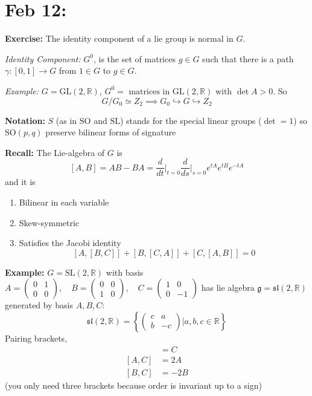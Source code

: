 \documentclass[12pt]{article}
\newcommand{\R}{\mathbb{R}}
\newcommand{\SL}{\text{SL}}
\newcommand{\SO}{\text{SO}}
\newcommand{\GL}{\text{GL}}
\newcommand{\g}{\mathfrak{g}}
\begin{document}
\section{Feb 12:}
    \textbf{Exercise:} The identity component of a lie group is normal in $G$. 

    \emph{Identity Component:} $G^0$, is the set of matrices $g \in G$ such that there is a path $\gamma: [0, 1] \to G$ from $1 \in G$ to $g \in G$. 

    \emph{Example:} $G= \GL(2, \R)$, $G^0 = \text{ matrices in } \GL(2, \R) \text{ with } \det A > 0$. So 
    \[G/G_0 \simeq Z_2 \implies G_0 \hookrightarrow G \hookrightarrow Z_2\]

    \textbf{Notation:} $S$ (as in $\text{SO}$ and $\text{SL}$) stands for the special linear groups ($\det = 1$) so $\SO(p, q)$ preserve bilinear forms of signature

    \textbf{Recall:} The Lie-algebra of $G$ is 
    \[[A, B] = AB - BA = \frac{d}{dt}\bigg\vert_{t=0}\frac{d}{ds}\bigg\vert_{s=0} e^{tA}e^{tB}e^{-tA}\] 
    and it is 
    \begin{enumerate}
        \item Bilinear in each variable 
        \item Skew-symmetric
        \item Satisfies the Jacobi identity
        \[[A, [B, C]] + [B, [C, A]] + [C, [A, B]] = 0\]
    \end{enumerate}

    \textbf{Example:} $G = \SL(2, \R)$ with basis $A = \begin{pmatrix}
        0 & 1\\ 
        0 & 0
    \end{pmatrix}, \quad B = \begin{pmatrix}
        0 & 0\\ 
        1 & 0
    \end{pmatrix}, \quad C = \begin{pmatrix}
        1 & 0\\ 
        0 & -1
    \end{pmatrix}$ has lie algebra $\g = \mathfrak{sl}(2, \R)$ generated by basis $A, B, C$:
    \[\mathfrak{sl}(2, \R) = \left\{\begin{pmatrix}
        c & a\\ 
        b & -c
    \end{pmatrix} \bigg\vert a, b, c \in \R\right\}\] 
    Pairing brackets, 
    \begin{align*}
        [A, B] &= C\\ 
        [A, C] &= 2A\\ 
        [B, C] &= -2B
    \end{align*}
    (you only need three brackets because order is invariant up to a sign) 
\end{document}
